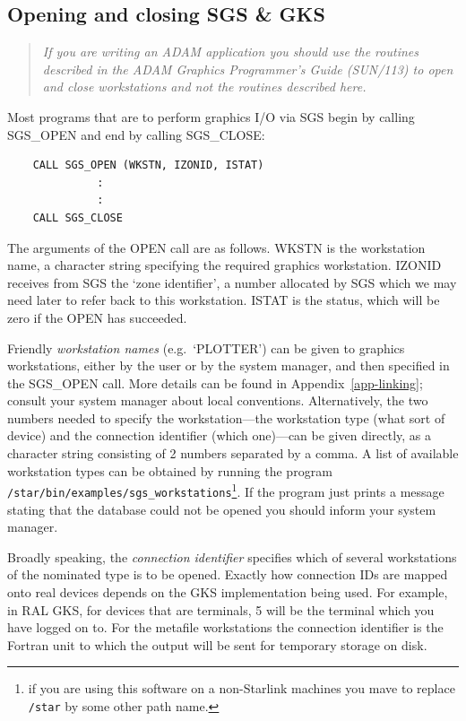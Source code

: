 \documentclass[11pt]{article}
\newcommand{\hyperref}[4]{#2\ref{#4}#3}
\newcommand{\htmlref}[2]{#1}
\newcommand{\xref}[3]{#1}
\begin{document}
\subsection {Opening and closing SGS \& GKS}\label{sec-op-cl}

\begin{quote}{\em
If you are writing an ADAM application you should use the routines described
in the ADAM Graphics Programmer's Guide (\xref{SUN/113}{sun113}{}) to open
and close workstations and not the routines described here.}
\end{quote}

Most programs that are to perform graphics I/O via SGS begin by calling
\htmlref{SGS\_OPEN}{SGS_OPEN} and end by calling
\htmlref{SGS\_CLOSE}{SGS_CLOSE}:
\begin{verbatim}
    CALL SGS_OPEN (WKSTN, IZONID, ISTAT)
              :
              :
    CALL SGS_CLOSE
\end{verbatim}
The arguments of the OPEN call are as follows.
WKSTN is the workstation name, a character string specifying the required
graphics workstation.
IZONID receives from SGS the `\htmlref{zone}{zones} identifier', a number
allocated by SGS which
we may need later to refer back to this workstation.
ISTAT is the status, which will be zero if the OPEN has succeeded.

Friendly {\em workstation names}\/ (e.g.\ `PLOTTER') can be given to graphics
workstations, either by the user or by the system manager, and then specified
in the SGS\_OPEN call.
More details can be found in
\hyperref{this appendix}{Appendix~}{}{app-linking};
consult your
system manager about local conventions.
Alternatively, the two numbers needed to specify the workstation---the
workstation type (what sort of device) and the connection identifier (which
one)---can be given directly, as a character string consisting of 2 numbers
separated by a comma.
A list of available workstation types can be obtained by running the program
{\tt /star/bin/examples/sgs\_workstations}\footnote{if you are using this
software on a non-Starlink machines you mave to replace {\tt /star} by some
other path name.}.
If the program just prints a message stating
that the database could not be opened you should inform your system manager.

Broadly speaking, the {\label{conid}\em{connection identifier}}\/
specifies which of several
workstations of the nominated type is to be opened.
Exactly how connection IDs are mapped onto real devices depends on the GKS
implementation being used.
For example, in RAL GKS, for devices that are terminals, 5 will be the
terminal which you have logged on to.
For the metafile workstations the connection identifier is the Fortran unit to
which the output will be sent for temporary storage on disk.
\end{document}
